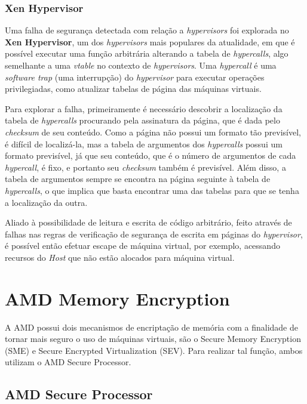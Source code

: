 \documentclass{report}
\begin{document}
\subsection{Xen Hypervisor}

Uma falha de segurança detectada com relação a \textit{hypervisors} foi
explorada no \textbf{Xen Hypervisor}, um dos \textit{hypervisors} mais
populares da atualidade, em que é possível executar uma função arbitrária
alterando a tabela de \textit{hypercalls}, algo semelhante a uma
\textit{vtable} no contexto de \textit{hypervisors}. Uma \textit{hypercall} é
uma \textit{software trap} (uma interrupção) do \textit{hypervisor} para
executar operações privilegiadas, como atualizar tabelas de página das máquinas
virtuais.

Para explorar a falha, primeiramente é necessário descobrir a localização da
tabela de \textit{hypercalls} procurando pela assinatura da página, que é dada
pelo \textit{checksum} de seu conteúdo. Como a página não possui um formato tão
previsível, é difícil de localizá-la, mas a tabela de argumentos dos
\textit{hypercalls} possui um formato previsível, já que seu conteúdo, que é o
número de argumentos de cada \textit{hypercall}, é fixo, e portanto seu
\textit{checksum} também é previsível. Além disso, a tabela de argumentos
sempre se encontra na página seguinte à tabela de \textit{hypercalls}, o que
implica que basta encontrar uma das tabelas para que se tenha a localização da
outra.

Aliado à possibilidade de leitura e escrita de código arbitrário, feito através
de falhas nas regras de verificação de segurança de escrita em páginas do
\textit{hypervisor}, é possível então efetuar escape de máquina virtual, por
exemplo, acessando recursos do \textit{Host} que não estão alocados para
máquina virtual.

\chapter{AMD Memory Encryption}

A AMD possui dois mecanismos de encriptação de memória com a finalidade de
tornar mais seguro o uso de máquinas virtuais, são o Secure Memory Encryption
(SME) e Secure Encrypted Virtualization (SEV). Para realizar tal função, ambos
utilizam o AMD Secure Processor.

\section{AMD Secure Processor}
\end{document}
